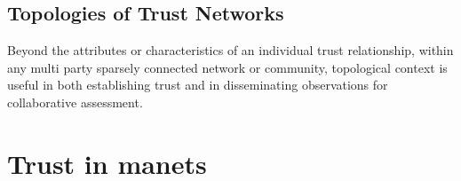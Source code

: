 \subsection{Topologies of Trust Networks}
\label{sec:trust_topologies}
Beyond the attributes or characteristics of an individual trust relationship, within any multi party sparsely connected network or community, topological context is useful in both establishing trust and in disseminating observations for collaborative assessment.


\section{Trust in \gls{manet}s}
